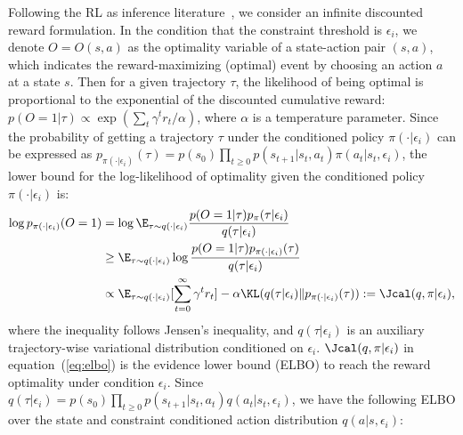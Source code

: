 Following the RL as inference literature~\cite{levine2018reinforcement, liu2023towards},
we consider an infinite discounted reward formulation. In the condition that the constraint threshold is $\epsilon_i$, we denote $O = O(s, a)$ as the optimality variable of a state-action pair $(s, a)$, which indicates the reward-maximizing (optimal) event by choosing an action $a$ at a state $s$. Then for a given trajectory $\tau$, the likelihood of being optimal is proportional to the exponential of the discounted cumulative reward: $p(O=1 | \tau) \propto \exp(\sum_t \gamma^t r_t/\alpha)$, where $\alpha$ is a temperature parameter. Since the probability of getting a trajectory $\tau$ under the conditioned policy $\pi(\cdot | \epsilon_i)$ can be expressed as $p_{\pi(\cdot | \epsilon_i)}(\tau)=p(s_0)\prod_{t\geq 0}p(s_{t+1} | s_t, a_t)\pi(a_t | s_t, \epsilon_i)$, the lower bound for the log-likelihood of optimality given the conditioned policy $\pi(\cdot | \epsilon_i)$ is:
\begin{equation}
\begin{aligned}
 \log p_{\pi(\cdot | \epsilon_i)}  (O=1) 
     & = \log \E_{\tau \sim q(\cdot | \epsilon_i)} \frac{p(O=1 | \tau)p_\pi(\tau | \epsilon_i)}{q(\tau | \epsilon_i) } \\
     & \geq \E_{\tau \sim q(\cdot | \epsilon_i)} \log \frac{p(O=1 | \tau)p_{\pi(\cdot | \epsilon_i)}(\tau)}{q(\tau | \epsilon_i) } \\ 
    & \propto \E_{\tau \sim q(\cdot | \epsilon_i)} [\sum_{t=0}^\infty \gamma^t r_t] - \alpha \KL(q(\tau | \epsilon_i)  \Vert p_{\pi(\cdot | \epsilon_i)}(\tau)) := \Jcal(q,\pi | \epsilon_i), \label{eq:elbo}
\end{aligned}
\end{equation}
where the inequality follows Jensen's inequality, and $q(\tau | \epsilon_i)$ is an auxiliary trajectory-wise variational distribution conditioned on $\epsilon_i$. $\Jcal(q,\pi | \epsilon_i)$ in equation~(\ref{eq:elbo}) is the evidence lower bound (ELBO) to reach the reward optimality under condition $\epsilon_i$. 
Since $q(\tau | \epsilon_i) = p(s_0)\prod_{t\geq0}p(s_{t+1}|s_t, a_t) q(a_t|s_t, \epsilon_i)$, we have the following ELBO over the state and constraint conditioned action distribution $q(a|s, \epsilon_i)$:
